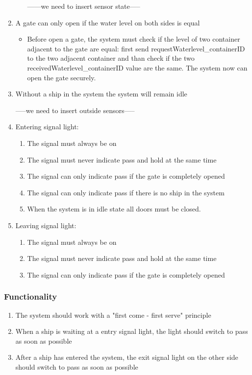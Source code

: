 \begin{enumerate}
\begin{itemize}
		
		------we need to insert sensor state-----
		
	\end{itemize}
	
	\item A gate can only open if the water level on both sides is equal
	\begin{itemize}
		\item Before open a gate, the system must check if the level of two container adjacent to the gate are equal: first send requestWaterlevel\_containerID to the two adjacent container and than check if the two receivedWaterlevel\_containerID value are the same. The system now can open the gate securely.
	\end{itemize}
	
	\item Without a ship in the system the system will remain idle
	
	-----we need to insert outside sensors-----
	
	\item Entering signal light:
		\begin{enumerate}
			\item The signal must always be on
			\item The signal must never indicate pass and hold at the same time
			\item The signal can only indicate pass if the gate is completely opened
			\item The signal can only indicate pass if there is no ship in the system
			\item When the system is in idle state all doors must be closed.
			
		\end{enumerate}
	\item Leaving signal light:
		\begin{enumerate}
			\item The signal must always be on
			\item The signal must never indicate pass and hold at the same time
			\item The signal can only indicate pass if the gate is completely opened
		\end{enumerate}
\end{enumerate}
\subsubsection*{Functionality}
\begin{enumerate}
	\item The system should work with a "first come - first serve" principle
	\item When a ship is waiting at a entry signal light, the light should switch to pass as soon as possible
	\item After a ship has entered the system, the exit signal light on the other side should switch to pass as soon as possible
\end{enumerate}